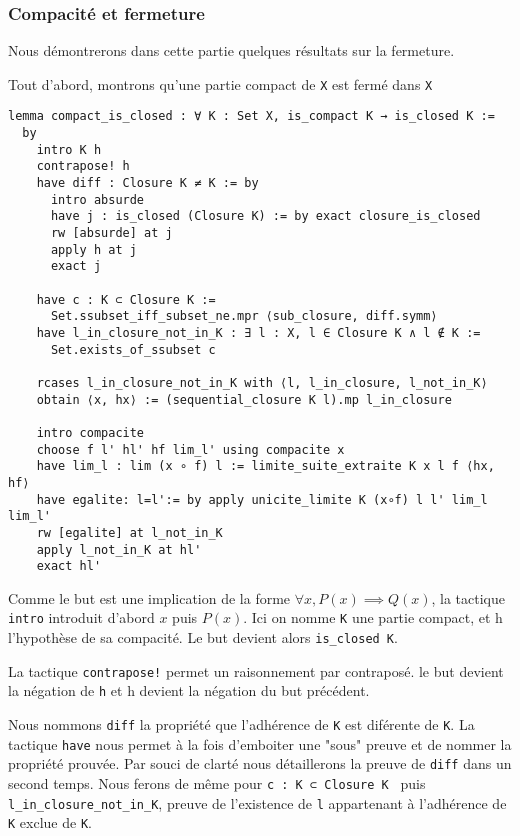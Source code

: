 \documentclass[a4paper, 12pt]{article}
\newcommand{\lean}[1]{\texttt{#1}}
\begin{document}
\subsubsection{Compacité et fermeture}
Nous démontrerons dans cette partie quelques résultats sur la fermeture.

Tout d'abord, montrons qu'une partie compact de \lean{X} est fermé dans \lean{X}

\begin{verbatim}   
lemma compact_is_closed : ∀ K : Set X, is_compact K → is_closed K := 
  by
    intro K h
    contrapose! h
    have diff : Closure K ≠ K := by
      intro absurde
      have j : is_closed (Closure K) := by exact closure_is_closed
      rw [absurde] at j
      apply h at j
      exact j

    have c : K ⊂ Closure K :=
      Set.ssubset_iff_subset_ne.mpr ⟨sub_closure, diff.symm⟩
    have l_in_closure_not_in_K : ∃ l : X, l ∈ Closure K ∧ l ∉ K :=
      Set.exists_of_ssubset c

    rcases l_in_closure_not_in_K with ⟨l, l_in_closure, l_not_in_K⟩
    obtain ⟨x, hx⟩ := (sequential_closure K l).mp l_in_closure

    intro compacite
    choose f l' hl' hf lim_l' using compacite x
    have lim_l : lim (x ∘ f) l := limite_suite_extraite K x l f ⟨hx, hf⟩
    have egalite: l=l':= by apply unicite_limite K (x∘f) l l' lim_l lim_l'
    rw [egalite] at l_not_in_K
    apply l_not_in_K at hl'
    exact hl'
\end{verbatim}

Comme le but est une implication de la forme $ \forall x, P(x) \implies Q(x)$, la tactique \lean{intro} introduit d'abord $x$ puis $P(x)$. Ici on nomme \lean{K} une partie compact, et h l'hypothèse de sa compacité. Le but devient alors \lean{is_closed K}.

La tactique \lean{contrapose!} permet un raisonnement par contraposé. le but devient la négation de \lean{h} et h devient la négation du but précédent.

Nous nommons \lean{diff} la propriété que l'adhérence de \lean{K} est diférente de \lean{K}. La tactique \lean{have} nous permet à la fois d'emboiter une "sous" preuve et de nommer la propriété prouvée. Par souci de clarté nous détaillerons la preuve de \lean{diff} dans un second temps. Nous ferons de même pour \lean{c : K ⊂ Closure K } puis \lean{l_in_closure_not_in_K}, preuve de l'existence de \lean{l} appartenant à l'adhérence de \lean{K} exclue de \lean{K}. 
\end{document}
